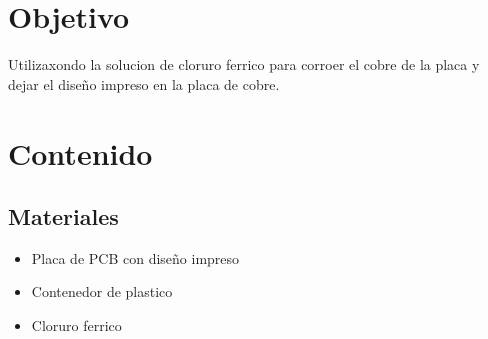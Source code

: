 \documentclass[12pt]{report}
\begin{document}
\chapter*{Objetivo}
Utilizaxondo la solucion de cloruro ferrico para corroer el cobre de la placa y dejar el diseño impreso en la placa de cobre.
\newpage

\chapter{Contenido}
\section{Materiales}
\begin{itemize}
    \item Placa de PCB con diseño impreso
    \item Contenedor de plastico
    \item Cloruro ferrico
\end{itemize}
\end{document}
